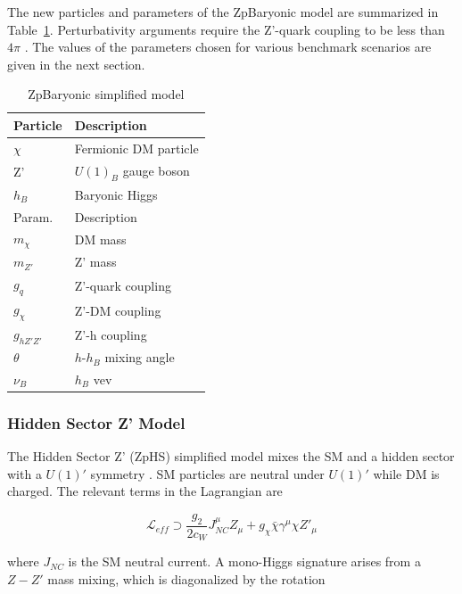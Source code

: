 The new particles and parameters of the ZpBaryonic model are summarized in Table~\ref{tab:ZpBaryonic}. Perturbativity arguments require the Z'-quark coupling to be less than $4\pi$ \cite{Carpenter:2013xra}. The values of the parameters chosen for various benchmark scenarios are given in the next section.

\begin{table}[htbH]
\begin{center}
\begin{tabular}{ l | l}
\hline
Particle & Description \\
\hline
$\chi$ & Fermionic DM particle \\
Z' & $U(1)_B$ gauge boson \\
$h_B$ & Baryonic Higgs \\
\hline
Param. & Description \\
\hline
$m_\chi$ & DM mass \\
$m_{Z'}$ & Z' mass \\
$g_q$ & Z'-quark coupling \\
$g_\chi$ & Z'-DM coupling \\
$g_{hZ'Z'}$ & Z'-h coupling \\
$\theta$ & $h$-$h_B$ mixing angle \\
$\nu_B$ & $h_B$ vev \\
\hline
\end{tabular}
\caption{ZpBaryonic simplified model}\label{tab:ZpBaryonic}
\end{center}
\end{table}

\subsubsection{Hidden Sector Z' Model}

The Hidden Sector Z' (ZpHS) simplified model mixes the SM and a hidden sector with a $U(1)'$ symmetry \cite{Chang:2006fp, Pospelov:2007mp, Feldman:2007wj, Feng:2008mu, Gopalakrishna:2008dv}. SM particles are neutral under $U(1)'$ while DM is charged. The relevant terms in the Lagrangian are

\begin{equation}
\mathcal{L}_{eff} \supset \frac{g_2}{2c_W} J^\mu_{NC} Z_\mu + g_\chi \bar{\chi} \gamma^\mu \chi Z'_\mu
\end{equation}

where $J_{NC}$ is the SM neutral current. A mono-Higgs signature arises from a $Z-Z'$ mass mixing, which is diagonalized by the rotation

